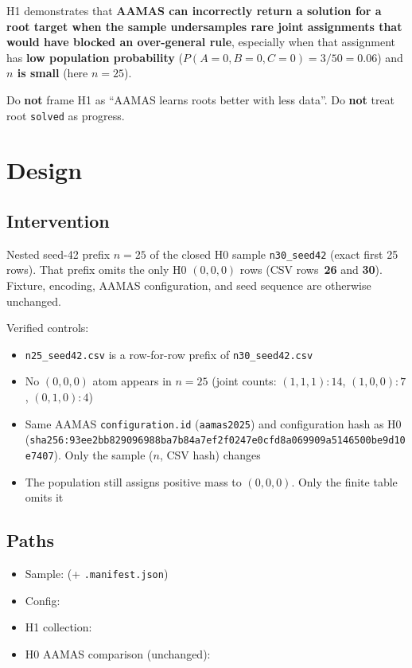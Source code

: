\documentclass[11pt]{article}
\begin{document}
H1 demonstrates that \textbf{AAMAS can incorrectly return a solution for a root
target when the sample undersamples rare joint assignments that would have
blocked an over-general rule}, especially when that assignment has \textbf{low
population probability}
(\(P(A{=}0,B{=}0,C{=}0)=3/50=0.06\)) and \textbf{\(n\) is small} (here
\(n=25\)).

Do \textbf{not} frame H1 as ``AAMAS learns roots better with less data''.
Do \textbf{not} treat root \texttt{solved} as progress.

\section{Design}

\subsection{Intervention}

Nested seed-42 prefix \(n{=}25\) of the closed H0 sample \texttt{n30\_seed42}
(exact first 25 rows).
That prefix omits the only H0 \((0,0,0)\) rows (CSV rows~\textbf{26} and
\textbf{30}).
Fixture, encoding, AAMAS configuration, and seed sequence are otherwise
unchanged.

Verified controls:
\begin{itemize}
  \item \texttt{n25\_seed42.csv} is a row-for-row prefix of
    \texttt{n30\_seed42.csv}
  \item No \((0,0,0)\) atom appears in \(n{=}25\) (joint counts:
    \((1,1,1):14\), \((1,0,0):7\), \((0,1,0):4\))
  \item Same AAMAS \texttt{configuration.id} (\texttt{aamas2025}) and
    configuration hash as H0
    (\texttt{sha256:93ee2bb829096988ba7b84a7ef2f0247e0cfd8a069909a5146500be9d10e7407}).
    Only the sample (\(n\), CSV hash) changes
  \item The population still assigns positive mass to \((0,0,0)\).
    Only the finite table omits it
\end{itemize}

\subsection{Paths}

\begin{itemize}
  \item Sample:
    (+ \texttt{.manifest.json})
  \item Config:
  \item H1 collection:
  \item H0 AAMAS comparison (unchanged):
\end{itemize}
\end{document}
